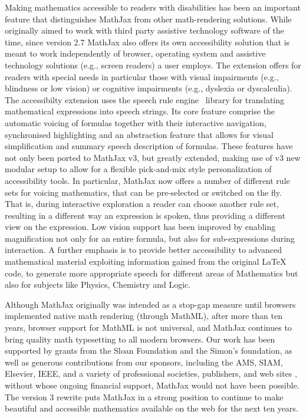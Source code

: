 \documentclass[11pt]{article} %
\begin{document}
Making mathematics accessible to readers with disabilities has been an
important feature that distinguishes MathJax from other math-rendering
solutions. While originally aimed to work with third party assistive
technology software of the time, since version 2.7 MathJax also offers
its own accessibility solution that is meant to work independently of
browser, operating system and assistive technology solutions (e.g.,
screen readers) a user employs. The extension offers for readers with
special needs in particular those with visual impairments (e.g.,
blindness or low vision) or cognitive impairments (e.g., dyslexia or
dyscalculia). The accessibilty extension uses the speech rule
engine~\cite{SRE} library for translating mathematical expressions
into speech strings. Its core feature comprise the automatic voicing
of formulas together with their interactive navigation, synchronised
highlighting and an abstraction feature that allows for visual
simplification and summary speech description of formulas.  These
features have not only been ported to MathJax v3, but greatly
extended, making use of v3 new modular setup to allow for a flexible
pick-and-mix style personalization of accessibility tools.  In
particular, MathJax now offers a number of different rule sets for
voicing mathematics, that can be pre-selected or switched on the
fly. That is, during interactive exploration a reader can choose
another rule set, resulting in a different way an expression is
spoken, thus providing a different view on the expression.  Low vision
support has been improved by enabling magnification not only for an
entire formula, but also for sub-expressions during interaction. A
further emphasis is to provide better accessibility to advanced
mathematical material exploiting information gained from the original
LaTeX code, to generate more appropriate speech for different areas of
Mathematics but also for subjects like Physics, Chemistry and Logic.

Although MathJax originally was intended as a stop-gap measure until
browsers implemented native math rendering (through MathML), after
more than ten years, browser support for MathML is not universal, and
MathJax continues to bring quality math typesetting to all modern
browsers.  Our work has been supported by grants from the Sloan
Foundation and the Simon's foundation, as well as generous
contributions from our sponsors, including the AMS, SIAM, Elsevier,
IEEE, and a variety of professional societies, publishers, and web
sites \cite{MJ-sponsors}, without whose ongoing financial support,
MathJax would not have been possible.  The version 3 rewrite puts
MathJax in a strong position to continue to make beautiful and
accessible mathematics available on the web for the next ten years.
\end{document}
